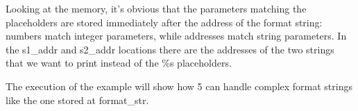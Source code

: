 Looking at the memory, it's obvious that the parameters matching the
placeholders are stored immediately after the address of the format string:
numbers match integer parameters, while addresses match string parameters. In
the s1\_addr and s2\_addr locations there are the addresses of the two strings
that we want to print instead of the \%s placeholders.

The execution of the example will show how \SC{} 5 can handle complex format
strings like the one stored at format\_str.
